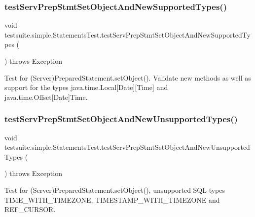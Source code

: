 \subsubsection{\texorpdfstring{test\+Serv\+Prep\+Stmt\+Set\+Object\+And\+New\+Supported\+Types()}{testServPrepStmtSetObjectAndNewSupportedTypes()}}
{\footnotesize\ttfamily void testsuite.\+simple.\+Statements\+Test.\+test\+Serv\+Prep\+Stmt\+Set\+Object\+And\+New\+Supported\+Types (\begin{DoxyParamCaption}{ }\end{DoxyParamCaption}) throws Exception}

Test for (Server)Prepared\+Statement.\+set\+Object(). Validate new methods as well as support for the types java.\+time.\+Local\mbox{[}Date\mbox{]}\mbox{[}Time\mbox{]} and java.\+time.\+Offset\mbox{[}Date\mbox{]}Time. \mbox{\label{classtestsuite_1_1simple_1_1_statements_test_a50dc87eaa732e080fb9d391c753c6b49}} 
\subsubsection{\texorpdfstring{test\+Serv\+Prep\+Stmt\+Set\+Object\+And\+New\+Unsupported\+Types()}{testServPrepStmtSetObjectAndNewUnsupportedTypes()}}
{\footnotesize\ttfamily void testsuite.\+simple.\+Statements\+Test.\+test\+Serv\+Prep\+Stmt\+Set\+Object\+And\+New\+Unsupported\+Types (\begin{DoxyParamCaption}{ }\end{DoxyParamCaption}) throws Exception}

Test for (Server)Prepared\+Statement.\+set\+Object(), unsupported S\+QL types T\+I\+M\+E\+\_\+\+W\+I\+T\+H\+\_\+\+T\+I\+M\+E\+Z\+O\+NE, T\+I\+M\+E\+S\+T\+A\+M\+P\+\_\+\+W\+I\+T\+H\+\_\+\+T\+I\+M\+E\+Z\+O\+NE and R\+E\+F\+\_\+\+C\+U\+R\+S\+OR. \mbox{\label{classtestsuite_1_1simple_1_1_statements_test_a38e65d199b2dae7aa98098c0c7c3424f}} 
